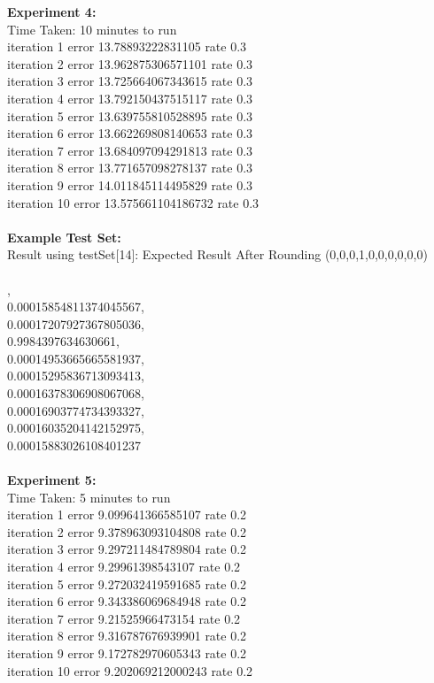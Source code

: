 \documentclass[11pt]{article}
\begin{document}
\begin{page}
\noindent \textbf{Experiment 4:} \\
Time Taken: 10 minutes to run\\

\noindent iteration 1 error 13.78893222831105 rate 0.3\\
iteration 2 error 13.962875306571101 rate 0.3\\
iteration 3 error 13.725664067343615 rate 0.3\\
iteration 4 error 13.792150437515117 rate 0.3\\
iteration 5 error 13.639755810528895 rate 0.3\\
iteration 6 error 13.662269808140653 rate 0.3\\
iteration 7 error 13.684097094291813 rate 0.3\\
iteration 8 error 13.771657098278137 rate 0.3\\
iteration 9 error 14.011845114495829 rate 0.3\\
iteration 10 error 13.575661104186732 rate 0.3\\\\

\noindent \textbf{Example Test Set:}\\
Result using testSet[14]: Expected Result After Rounding (0,0,0,1,0,0,0,0,0,0)\\\\

,\\
  0.00015854811374045567,\\
  0.00017207927367805036,\\
  0.9984397634630661,\\
  0.00014953665665581937,\\
  0.00015295836713093413,\\
  0.00016378306908067068,\\
  0.00016903774734393327,\\
  0.00016035204142152975,\\
  0.00015883026108401237\\
\\
\noindent \textbf{Experiment 5:} \\
Time Taken: 5 minutes to run\\

\noindent iteration 1 error 9.099641366585107 rate 0.2\\
iteration 2 error 9.378963093104808 rate 0.2\\
iteration 3 error 9.297211484789804 rate 0.2\\
iteration 4 error 9.29961398543107 rate 0.2\\
iteration 5 error 9.272032419591685 rate 0.2\\
iteration 6 error 9.343386069684948 rate 0.2\\
iteration 7 error 9.21525966473154 rate 0.2\\
iteration 8 error 9.316787676939901 rate 0.2\\
iteration 9 error 9.172782970605343 rate 0.2\\
iteration 10 error 9.202069212000243 rate 0.2\\\\


\end{page}
\end{document}

